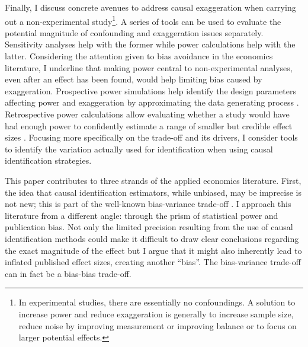 			Finally, I discuss concrete avenues to address causal exaggeration when carrying out a non-experimental study\footnote{In experimental studies, there are essentially no confoundings. A solution to increase power and reduce exaggeration is generally to increase sample size, reduce noise by improving measurement or improving balance or to focus on larger potential effects.}. A series of tools can be used to evaluate the potential magnitude of confounding and exaggeration issues separately. Sensitivity analyses help with the former while power calculations help with the latter. %
			Considering the attention given to bias avoidance in the economics literature, I underline that making power central to non-experimental analyses, even after an effect has been found, would help limiting bias caused by exaggeration. Prospective power simulations help identify the design parameters affecting power and exaggeration by approximating the data generating process \citep{gelman_regression_2020, black_simulated_2022}. Retrospective power calculations allow evaluating whether a study would have had enough power to confidently estimate a range of smaller but credible effect sizes \citep{gelman_beyond_2014, stommes_reliability_2021}.
			Focusing more specifically on the trade-off and its drivers, I consider tools to identify the variation actually used for identification when using causal identification strategies. %
						
			This paper contributes to three strands of the applied economics literature. First, the idea that causal identification estimators, while unbiased, may be imprecise is not new; this is part of the well-known bias-variance trade-off \citep{imbens_optimal_2012, deaton_understanding_2018, hernan_causal_2020, ravallion_should_2020}. I approach this literature from a different angle: through the prism of statistical power and publication bias. Not only the limited precision resulting from the use of causal identification methods could make it difficult to draw clear conclusions regarding the exact magnitude of the effect but I argue that it might also inherently lead to inflated published effect sizes, creating another ``bias''. The bias-variance trade-off can in fact be a bias-bias trade-off.
			

